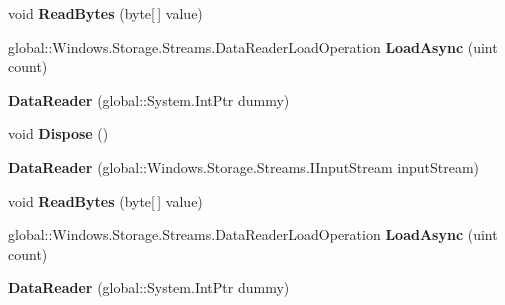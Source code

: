 \begin{DoxyCompactItemize}
void {\bfseries Read\+Bytes} (byte\mbox{[}$\,$\mbox{]} value)
\item 
\mbox{\label{class_windows_1_1_storage_1_1_streams_1_1_data_reader_a8851a4d0dcb16463f109906d39321a9d}} 
global\+::\+Windows.\+Storage.\+Streams.\+Data\+Reader\+Load\+Operation {\bfseries Load\+Async} (uint count)
\item 
\mbox{\label{class_windows_1_1_storage_1_1_streams_1_1_data_reader_a7190172f276be7251509999eeed10931}} 
{\bfseries Data\+Reader} (global\+::\+System.\+Int\+Ptr dummy)
\item 
\mbox{\label{class_windows_1_1_storage_1_1_streams_1_1_data_reader_a6010f889660514f452ca98b0453d9573}} 
void {\bfseries Dispose} ()
\item 
\mbox{\label{class_windows_1_1_storage_1_1_streams_1_1_data_reader_a5898ae07f0205f604d43e9c687b92944}} 
{\bfseries Data\+Reader} (global\+::\+Windows.\+Storage.\+Streams.\+I\+Input\+Stream input\+Stream)
\item 
\mbox{\label{class_windows_1_1_storage_1_1_streams_1_1_data_reader_a3ef0353a0e8404fcce465021822f372f}} 
void {\bfseries Read\+Bytes} (byte\mbox{[}$\,$\mbox{]} value)
\item 
\mbox{\label{class_windows_1_1_storage_1_1_streams_1_1_data_reader_a8851a4d0dcb16463f109906d39321a9d}} 
global\+::\+Windows.\+Storage.\+Streams.\+Data\+Reader\+Load\+Operation {\bfseries Load\+Async} (uint count)
\item 
\mbox{\label{class_windows_1_1_storage_1_1_streams_1_1_data_reader_a7190172f276be7251509999eeed10931}} 
{\bfseries Data\+Reader} (global\+::\+System.\+Int\+Ptr dummy)
\item 
\mbox{\label{class_windows_1_1_storage_1_1_streams_1_1_data_reader_a6010f889660514f452ca98b0453d9573}} 

\end{DoxyCompactItemize}
